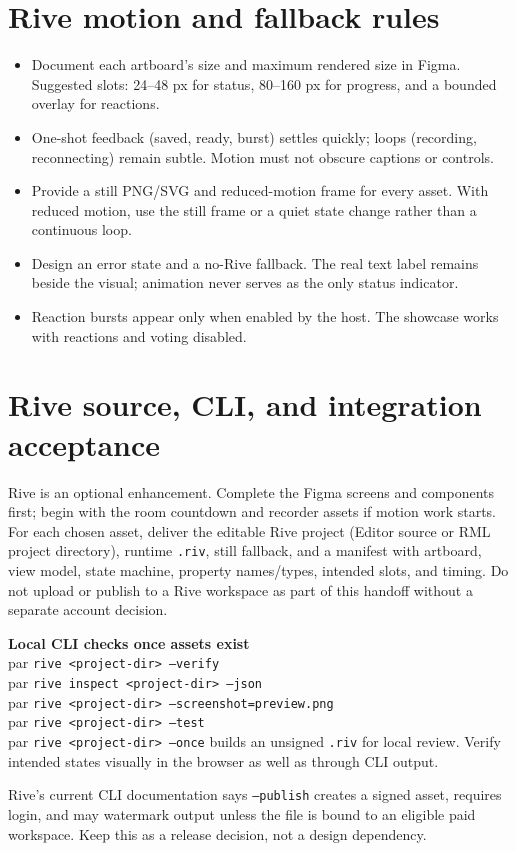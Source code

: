 \documentclass[10pt,a4paper]{article}
\begin{document}
\section{Rive motion and fallback rules}
\begin{itemize}
\item Document each artboard's size and maximum rendered size in Figma. Suggested slots: 24--48 px for status, 80--160 px for progress, and a bounded overlay for reactions.
\item One-shot feedback (saved, ready, burst) settles quickly; loops (recording, reconnecting) remain subtle. Motion must not obscure captions or controls.
\item Provide a still PNG/SVG and reduced-motion frame for every asset. With reduced motion, use the still frame or a quiet state change rather than a continuous loop.
\item Design an error state and a no-Rive fallback. The real text label remains beside the visual; animation never serves as the only status indicator.
\item Reaction bursts appear only when enabled by the host. The showcase works with reactions and voting disabled.
\end{itemize}

\section{Rive source, CLI, and integration acceptance}
Rive is an optional enhancement. Complete the Figma screens and components first; begin with the room countdown and recorder assets if motion work starts. For each chosen asset, deliver the editable Rive project (Editor source or RML project directory), runtime \texttt{.riv}, still fallback, and a manifest with artboard, view model, state machine, property names/types, intended slots, and timing. Do not upload or publish to a Rive workspace as part of this handoff without a separate account decision.
\begin{callout}
\textbf{Local CLI checks once assets exist}\\par
\texttt{rive <project-dir> --verify}\\par
\texttt{rive inspect <project-dir> --json}\\par
\texttt{rive <project-dir> --screenshot=preview.png}\\par
\texttt{rive <project-dir> --test}\\par
\texttt{rive <project-dir> --once} builds an unsigned \texttt{.riv} for local review. Verify intended states visually in the browser as well as through CLI output.
\end{callout}
Rive's current CLI documentation says \texttt{--publish} creates a signed asset, requires login, and may watermark output unless the file is bound to an eligible paid workspace. Keep this as a release decision, not a design dependency.
\end{document}
